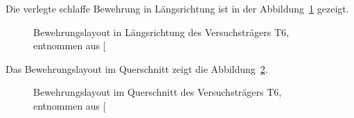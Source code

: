 \documentclass[
  11pt,
  letterpaper,
]{scrreprt}
\begin{document}
Die verlegte schlaffe Bewehrung in Längsrichtung ist in der
Abbildung~\ref{fig-bewehrung_laengs_t6} gezeigt.

\begin{figure}[H]


\caption{\label{fig-bewehrung_laengs_t6}Bewehrungslayout in
Längsrichtung des Versuchsträgers T6, entnommen aus
{[}\citeproc{ref-sigrist_versuche_1993}{5}{]}}

\end{figure}%

Das Bewehrungslayout im Querschnitt zeigt die
Abbildung~\ref{fig-bewehrung_qs_t6}.

\begin{figure}[H]


\caption{\label{fig-bewehrung_qs_t6}Bewehrungslayout im Querschnitt des
Versuchsträgers T6, entnommen aus
{[}\citeproc{ref-sigrist_versuche_1993}{5}{]}}

\end{figure}%
\end{document}
